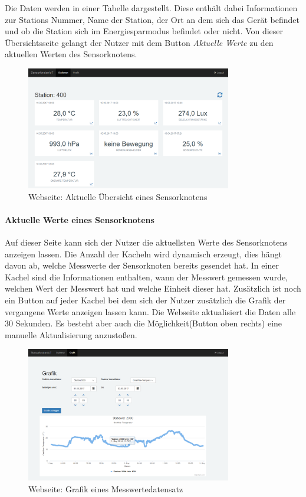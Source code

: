 Die Daten werden in einer Tabelle dargestellt. Diese enthält dabei Informationen zur Stations Nummer, Name der Station, der Ort an dem sich das Gerät befindet und ob die Station sich im Energiesparmodus befindet oder nicht. Von dieser Übersichtsseite gelangt der Nutzer mit dem Button \textit{Aktuelle Werte} zu den aktuellen Werten des Sensorknotens. 
\begin{figure}
	\centering
	\includegraphics[width=0.8\textwidth]{bilder/WebseiteSensorknotenAktuell}
	\caption{Webseite: Aktuelle Übersicht eines Sensorknotens}
	\label{img:WebseiteSensorknotenAktuell}
\end{figure}
\paragraph{Aktuelle Werte eines Sensorknotens} Auf dieser Seite kann sich der Nutzer die aktuellsten Werte des Sensorknotens anzeigen lassen. Die Anzahl der Kacheln wird dynamisch erzeugt, dies hängt davon ab,  welche Messwerte der Sensorknoten bereits gesendet hat. In einer Kachel sind die Informationen enthalten, wann der Messwert gemessen wurde, welchen Wert der Messwert hat und welche Einheit dieser hat. Zusätzlich ist noch ein Button auf jeder Kachel bei dem sich der Nutzer zusätzlich die Grafik der vergangene Werte anzeigen lassen kann. Die Webseite aktualisiert die Daten alle 30 Sekunden. Es besteht aber auch die Möglichkeit(Button oben rechts) eine manuelle Aktualisierung anzustoßen.
\begin{figure}
	\centering
	\includegraphics[width=0.8\textwidth]{bilder/WebseiteGrafik}
	\caption{Webseite: Grafik eines Messwertedatensatz}
	\label{img:WebseiteGrafik}
\end{figure}

